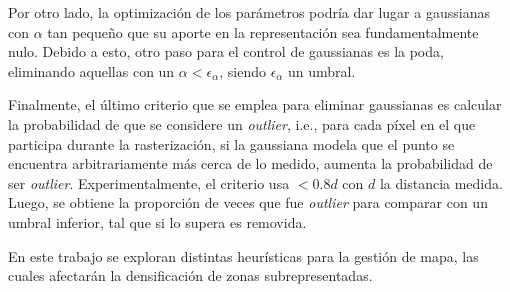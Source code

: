 Por otro lado, la optimización de los parámetros podría dar lugar a gaussianas con $\alpha$ tan pequeño que su aporte en la representación sea fundamentalmente nulo. Debido a esto, otro paso para el control de gaussianas es la poda, eliminando aquellas con un $\alpha < \epsilon_\alpha$, siendo $\epsilon_\alpha$ un umbral.

Finalmente, el último criterio que se emplea para eliminar gaussianas es calcular la probabilidad de que se considere un \textit{outlier}, i.e., para cada píxel en el que participa durante la rasterización, si la gaussiana modela que el punto se encuentra arbitrariamente más cerca de lo medido, aumenta la probabilidad de ser \textit{outlier}. Experimentalmente, el criterio usa $<0.8d$ con $d$ la distancia medida. Luego, se obtiene la proporción de veces que fue \textit{outlier} para comparar con un umbral inferior, tal que si lo supera es removida.

En este trabajo se exploran distintas heurísticas para la gestión de mapa, las cuales afectarán la densificación de zonas subrepresentadas.




